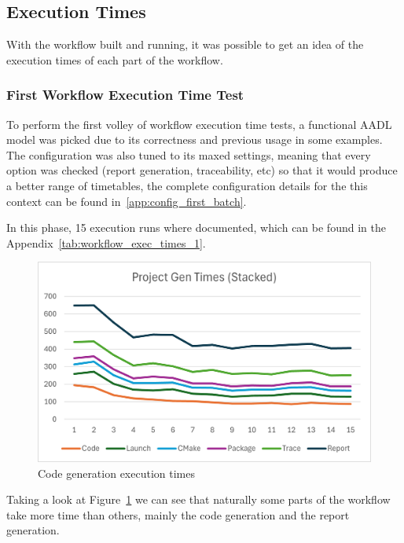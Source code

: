 \subsection{Execution Times}
\label{sec:exec_times}

With the workflow built and running, it was possible to get an idea of the execution times of each part of the workflow.

\subsubsection{First Workflow Execution Time Test}
\label{sec:exec_times_v1}

To perform the first volley of workflow execution time tests, a functional \gls{AADL} model was picked due to its correctness and previous usage in some examples. The configuration was also tuned to its maxed settings, meaning that every option was checked (report generation, traceability, etc) so that it would produce a better range of timetables, the complete configuration details for the this context can be found in~\ref{app:config_first_batch}.

In this phase, 15 execution runs where documented, which can be found in the Appendix~\ref{tab:workflow_exec_times_1}.

\begin{figure}[htbp]
	\centering
	\includegraphics[width=\textwidth]{exec_times1.png}
	\caption{Code generation execution times}
	\label{fig:exec_times_1}
\end{figure}

Taking a look at Figure~\ref{fig:exec_times_1} we can see that naturally some parts of the workflow take more time than others, mainly the code generation and the report generation.

